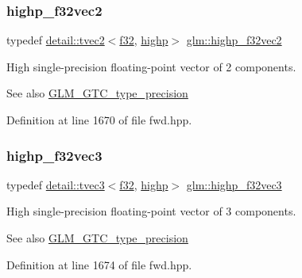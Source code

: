\subsubsection{\texorpdfstring{highp\+\_\+f32vec2}{highp\_f32vec2}}
{\footnotesize\ttfamily typedef \hyperlink{structglm_1_1detail_1_1tvec2}{detail\+::tvec2}$<$\hyperlink{group__gtc__type__precision_ga0ec999b57f5330d9021256e96038df04}{f32}, \hyperlink{namespaceglm_a0f04f086094c747d227af4425893f545ac6f7eab42eacbb10d59a58e95e362074}{highp}$>$ \hyperlink{group__gtc__type__precision_gabba3e1b3ae0bcaa7aaac573c08c2f8d3}{glm\+::highp\+\_\+f32vec2}}

High single-\/precision floating-\/point vector of 2 components. \begin{DoxySeeAlso}{See also}
\hyperlink{group__gtc__type__precision}{G\+L\+M\+\_\+\+G\+T\+C\+\_\+type\+\_\+precision} 
\end{DoxySeeAlso}


Definition at line 1670 of file fwd.\+hpp.

\mbox{\label{group__gtc__type__precision_ga581a4a4eb1f3a269d16af0c4e2d8daf4}} 
\subsubsection{\texorpdfstring{highp\+\_\+f32vec3}{highp\_f32vec3}}
{\footnotesize\ttfamily typedef \hyperlink{structglm_1_1detail_1_1tvec3}{detail\+::tvec3}$<$\hyperlink{group__gtc__type__precision_ga0ec999b57f5330d9021256e96038df04}{f32}, \hyperlink{namespaceglm_a0f04f086094c747d227af4425893f545ac6f7eab42eacbb10d59a58e95e362074}{highp}$>$ \hyperlink{group__gtc__type__precision_ga581a4a4eb1f3a269d16af0c4e2d8daf4}{glm\+::highp\+\_\+f32vec3}}

High single-\/precision floating-\/point vector of 3 components. \begin{DoxySeeAlso}{See also}
\hyperlink{group__gtc__type__precision}{G\+L\+M\+\_\+\+G\+T\+C\+\_\+type\+\_\+precision} 
\end{DoxySeeAlso}


Definition at line 1674 of file fwd.\+hpp.

\mbox{\label{group__gtc__type__precision_ga53d3c1a17e2e6f26ee5ad1e8879d710e}} 
